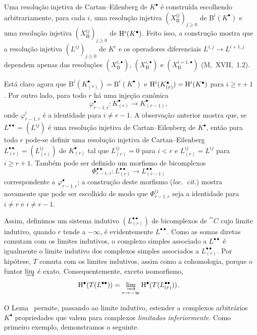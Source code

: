 Uma resolução injetiva de Cartan--Eilenberg de $K^\bullet$ é construída escolhendo arbitrariamente, para cada $i$, uma resolução injetiva $(X_{\mathrm{B}}^{ij})_{j\geq 0}$ de $\mathrm{B}^i(K^\bullet)$ e uma resolução injetiva $(X_{\mathrm{H}}^{ij})_{j\geq 0}$ de $\mathrm{H}^i(K^\bullet)$.
Feito isso, a construção mostra que a resolução injetiva $(L^{ij})_{j\geq 0}$ de $K^i$ e os operadores diferenciais $L^{i,j}\to L^{i+1,j}$ dependem apenas das resoluções $(X_{\mathrm{B}}^{i,\bullet})$, $(X_{\mathrm{H}}^{i,\bullet})$ e $(X_{\mathrm{B}}^{i+1,\bullet})$ (M,~XVII,~1.2).

Está claro agora que $\mathrm{B}^i(K^\bullet_{(r)})=\mathrm{B}^i(K^\bullet)$ e $\mathrm{H}^i(K^\bullet_{(r)})=\mathrm{H}^i(K^\bullet)$ para $i\geq r+1$.
Por outro lado, para todo $r$ há uma injeção canônica
\[
  \varphi^\bullet_{r-1,r}:K^\bullet_{(r)}\longrightarrow K^\bullet_{(r-1)},
\]
onde $\varphi^i_{r-1,r}$ é a identidade para $i\neq r-1$.
A observação anterior mostra que, se $L^{\bullet\bullet}=(L^{ij})$ é uma resolução injetiva de Cartan--Eilenberg de $K^\bullet$, então para todo $r$ pode-se definir uma resolução injetiva de Cartan--Eilenberg $L^{\bullet\bullet}_{(r)}=(L^{ij}_{(r)})$ de $K^\bullet_{(r)}$ tal que $L^{ij}_{(r)}=0$ para $i<r$ e $L^{ij}_{(r)}=L^{ij}$ para $i\geq r+1$.
Também pode ser definido um morfismo de bicomplexos
\[
  \Phi^{\bullet\bullet}_{r-1,r}:L^{\bullet\bullet}_{(r)}
  \longrightarrow L^{\bullet\bullet}_{(r-1)}
\]
correspondente a $\varphi^\bullet_{r-1,r}$; a construção deste morfismo (\emph{loc.\ cit.}) mostra novamente que pode ser escolhido de modo que $\Phi^{ij}_{r-1,r}$ seja a identidade para $i\neq r$ e $i\neq r-1$.

Assim, definimos um sistema indutivo $(L^{\bullet\bullet}_{(r)})$ de bicomplexos de $\cat{C}$ cujo limite indutivo, quando $r$ tende a $-\infty$, é evidentemente $L^{\bullet\bullet}$.
Como as somas diretas comutam com os limites indutivos, o complexo simples associado a $L^{\bullet\bullet}$ é igualmente o limite indutivo dos complexos simples associados a $L^{\bullet\bullet}_{(r)}$.
Por hipótese, $T$ comuta com os limites indutivos, assim como a cohomologia, porque o funtor $\varinjlim$ é exato.
Consequentemente, exceto isomorfismo,
\[
  \HH^\bullet(T(L^{\bullet\bullet}))
  =\varinjlim_{r\to-\infty}\HH^\bullet(T(L^{\bullet\bullet}_{(r)})).
\]

O Lema~ permite, passando ao limite indutivo, estender a complexos arbitrários $K^\bullet$ propriedades que valem para complexos \emph{limitados inferiormente}.
Como primeiro exemplo, demonstramos o seguinte.

